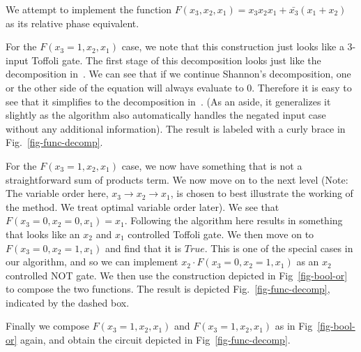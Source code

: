 \begin{example}
  \label{ex-bool}
  We attempt to implement the function $F(x_3,x_2,x_1) = x_3x_2x_1 + \bar{x_3}(x_1 + x_2)$ as its relative phase equivalent.  
     
     For the $F(x_3 = 1,x_2,x_1)$ case, we note that this construction just looks like a 3-input Toffoli gate. The first stage of this decomposition looks just like the
  decomposition in~\cite{bib-rtof-maslov}. We can see that if we
  continue Shannon's decomposition, one or the other side of the
  equation will always evaluate to 0. Therefore it is easy to see that it simplifies to the
  decomposition in~\cite{bib-amy-phase-state}. (As an aside, it generalizes it slightly as the algorithm also automatically handles the negated input case without any additional information). The result is labeled with a curly brace in Fig.~\ref{fig-func-decomp}. 
  
     \vspace{-0.1cm}
     For the $F(x_3 = 1,x_2,x_1)$ case, we now have something that is not a straightforward sum of products term. We now move on to the next level (Note: The variable order here, $x_3 \rightarrow x_2 \rightarrow x_1$, is chosen to best illustrate the working of the method. We treat optimal variable order later). We see that $F(x_3 = 0,x_2=0,x_1) = x_1$. Following the algorithm here results in something that looks like an $x_2$ and $x_1$ controlled Toffoli gate. We then move on to $F(x_3 = 0,x_2=1,x_1)$ and find that it is $True$. This is one of the special cases in our algorithm, and so we can implement $x_2 \cdot F(x_3 = 0,x_2=1,x_1)$ as an $x_2$ controlled NOT gate. We then use the construction depicted in Fig~\ref{fig-bool-or} to compose the two functions. The result is depicted Fig.~\ref{fig-func-decomp}, indicated by the dashed box. 
     
     Finally we compose $F(x_3 = 1,x_2,x_1)$ and $F(x_3 = 1,x_2,x_1)$ as in Fig~\ref{fig-bool-or} again, and obtain the circuit depicted in Fig~\ref{fig-func-decomp}.
\end{example}

    
